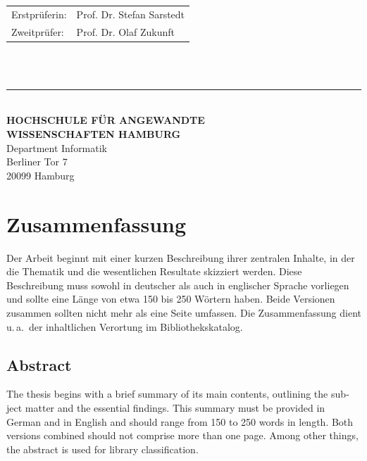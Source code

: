 \begin{titlepage}
  \hspace*{37mm}
  \begin{minipage}{0.5\linewidth}
    \begin{tabular}{@{}ll}
      Erstprüferin: & Prof. Dr. Stefan Sarstedt\\[-.3mm]
      Zweitprüfer: & Prof. Dr. Olaf Zukunft \\
    \end{tabular}\\

    \,\rule{9mm}{1mm}\\[1.5mm]

    \textbf{HOCHSCHULE FÜR ANGEWANDTE}\\
    \textbf{WISSENSCHAFTEN HAMBURG}\\
    Department Informatik\\
    Berliner Tor 7\\
    20099 Hamburg
  \end{minipage}
\end{titlepage}
\restoregeometry

\thispagestyle{empty}
\section*{Zusammenfassung}

Der Arbeit beginnt mit einer kurzen Beschreibung ihrer zentralen Inhalte, in
der die Thematik und die wesentlichen Resultate skizziert werden.  Diese
Beschreibung muss sowohl in deutscher als auch in englischer Sprache vorliegen
und sollte eine Länge von etwa 150 bis 250 Wörtern haben.  Beide Versionen
zusammen sollten nicht mehr als eine Seite umfassen.  Die Zusammenfassung
dient u.\,a.\ der inhaltlichen Verortung im Bibliothekskatalog.

{
  \begin{otherlanguage}{english}
    \section*{Abstract}

    The thesis begins with a brief summary of its main contents, outlining the
    subject matter and the essential findings.  This summary must be provided
    in German and in English and should range from 150 to 250 words in length.
    Both versions combined should not comprise more than one page.  Among
    other things, the abstract is used for library classification.
  \end{otherlanguage}
}
